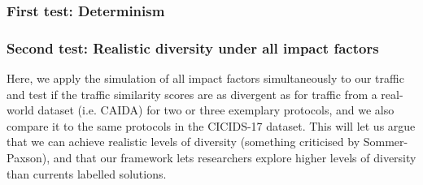 \documentclass{article}
\begin{document}
\subsubsection{First test: Determinism}



\subsubsection{Second test: Realistic diversity under all impact factors}


Here, we apply the simulation of all impact factors simultaneously to our traffic and test if the traffic similarity scores are as divergent as for traffic from a real-world dataset (i.e. CAIDA) for two or three exemplary protocols, and we also compare it to the same protocols in the CICIDS-17 dataset. This will let us argue that we can achieve realistic levels of diversity (something criticised by Sommer-Paxson), and that our framework lets researchers explore higher levels of diversity than currents labelled solutions.













\end{document}
